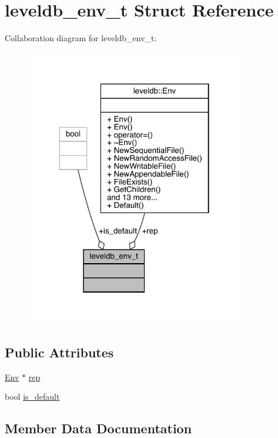 \hypertarget{structleveldb__env__t}{}\section{leveldb\+\_\+env\+\_\+t Struct Reference}
\label{structleveldb__env__t}


Collaboration diagram for leveldb\+\_\+env\+\_\+t\+:
\nopagebreak
\begin{figure}[H]
\begin{center}
\leavevmode
\includegraphics[width=270pt]{structleveldb__env__t__coll__graph}
\end{center}
\end{figure}
\subsection*{Public Attributes}
\begin{DoxyCompactItemize}
\item 
\mbox{\hyperlink{classleveldb_1_1_env}{Env}} $\ast$ \mbox{\hyperlink{structleveldb__env__t_ad41038b41aebaf7ffba1a4bbfaa8b539}{rep}}
\item 
bool \mbox{\hyperlink{structleveldb__env__t_a53e285385a628e932128aec1f0fe1dae}{is\+\_\+default}}
\end{DoxyCompactItemize}


\subsection{Member Data Documentation}
\mbox{\label{structleveldb__env__t_a53e285385a628e932128aec1f0fe1dae}} 
